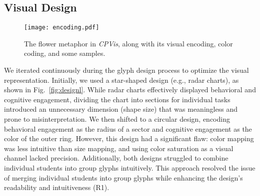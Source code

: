 \subsection{Visual Design}
\begin{figure*}
	\centering
	\texttt{[image: encoding.pdf]}
	\caption{The flower metaphor in \textit{CPVis}, along with its visual encoding, color coding, and some samples.}
	\label{fig:encoding1}
\end{figure*}

We iterated continuously during the glyph design process to optimize the visual representation. Initially, we used a star-shaped design (e.g., radar charts), as shown in Fig.~\ref{fig:designl}. While radar charts effectively displayed behavioral and cognitive engagement, dividing the chart into sections for individual tasks introduced an unnecessary dimension (shape size) that was meaningless and prone to misinterpretation. 
We then shifted to a circular design, encoding behavioral engagement as the radius of a sector and cognitive engagement as the color of the outer ring. However, this design had a significant flaw: color mapping was less intuitive than size mapping, and using color saturation as a visual channel lacked precision. Additionally, both designs struggled to combine individual students into group glyphs intuitively.
This approach resolved the issue of merging individual students into group glyphs while enhancing the design's readability and intuitiveness (R1). 


